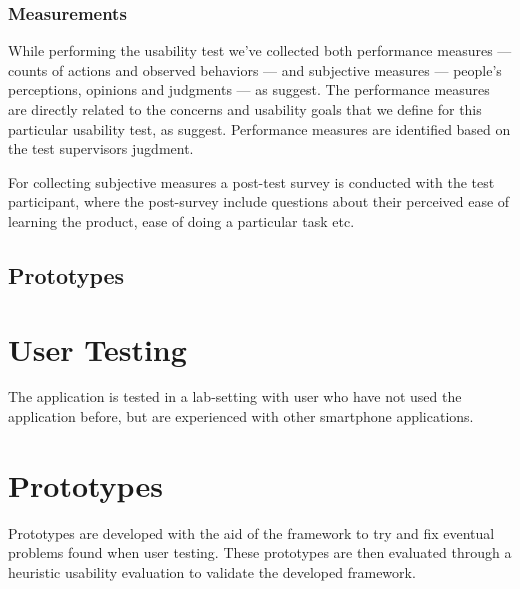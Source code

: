 \subsubsection{Measurements}
\label{subsubsec:measurements}
While performing the usability test we've collected both performance measures --- counts of actions and observed behaviors --- and subjective measures --- people's perceptions, opinions and judgments --- as \cite{Dumas1999} suggest.
The performance measures are directly related to the concerns and usability goals that we define for this particular usability test, as \cite{Dumas1999} suggest. Performance measures are identified based on the test supervisors jugdment.

For collecting subjective measures a post-test survey is conducted with the test participant, where the post-survey include questions about their perceived ease of learning the product, ease of doing a particular task etc.

\subsection{Prototypes}

\section{User Testing}
The application is tested in a lab-setting with user who have not used the application before, but are experienced with other smartphone applications. 

\section{Prototypes}
%
Prototypes are developed with the aid of the framework to try and fix eventual problems found when user testing. These prototypes are then evaluated through a heuristic usability evaluation to validate the developed framework.
